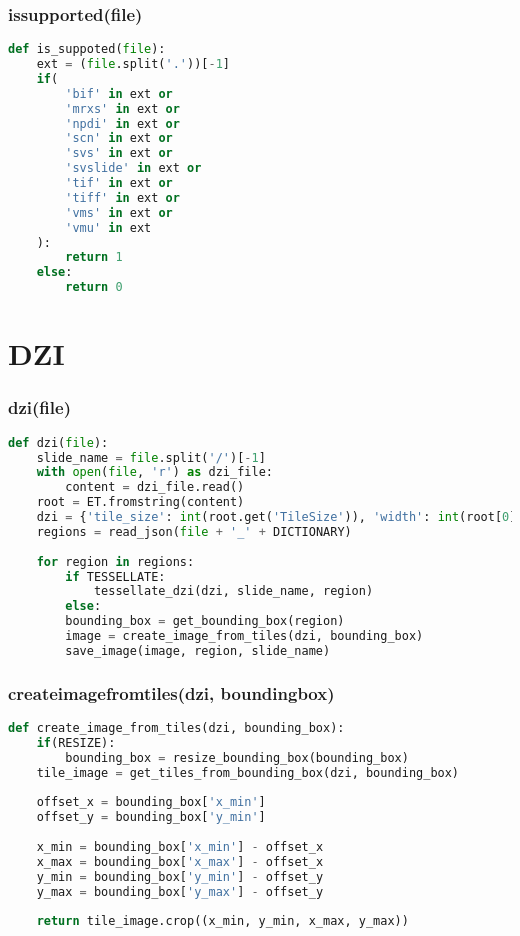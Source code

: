\subsubsection{is{\textunderscore}supported(file)}

\begin{lstlisting}[frame=single,language=python]
def is_suppoted(file):
	ext = (file.split('.'))[-1]
	if(
		'bif' in ext or
		'mrxs' in ext or
		'npdi' in ext or
		'scn' in ext or
		'svs' in ext or
		'svslide' in ext or
		'tif' in ext or
		'tiff' in ext or
		'vms' in ext or
		'vmu' in ext
	):
		return 1
	else:
		return 0
\end{lstlisting}


\section{DZI}

\subsubsection{dzi(file)}

\begin{lstlisting}[frame=single,language=python]
def dzi(file):
	slide_name = file.split('/')[-1]
	with open(file, 'r') as dzi_file:
		content = dzi_file.read()
	root = ET.fromstring(content)
	dzi = {'tile_size': int(root.get('TileSize')), 'width': int(root[0].get('Width')), 'height': int(root[0].get('Height')), 'tile_source': get_tile_source(file), 'format': root.get('Format')}
	regions = read_json(file + '_' + DICTIONARY)
	
	for region in regions:
		if TESSELLATE:
			tessellate_dzi(dzi, slide_name, region)
		else:
		bounding_box = get_bounding_box(region)
		image = create_image_from_tiles(dzi, bounding_box)
		save_image(image, region, slide_name)
\end{lstlisting}


\subsubsection{create{\textunderscore}image{\textunderscore}from{\textunderscore}tiles(dzi, bounding{\textunderscore}box)}

\begin{lstlisting}[frame=single,language=python]
def create_image_from_tiles(dzi, bounding_box):
	if(RESIZE):
		bounding_box = resize_bounding_box(bounding_box)
	tile_image = get_tiles_from_bounding_box(dzi, bounding_box)
	
	offset_x = bounding_box['x_min']
	offset_y = bounding_box['y_min']
	
	x_min = bounding_box['x_min'] - offset_x
	x_max = bounding_box['x_max'] - offset_x
	y_min = bounding_box['y_min'] - offset_y
	y_max = bounding_box['y_max'] - offset_y
	
	return tile_image.crop((x_min, y_min, x_max, y_max))
\end{lstlisting}


